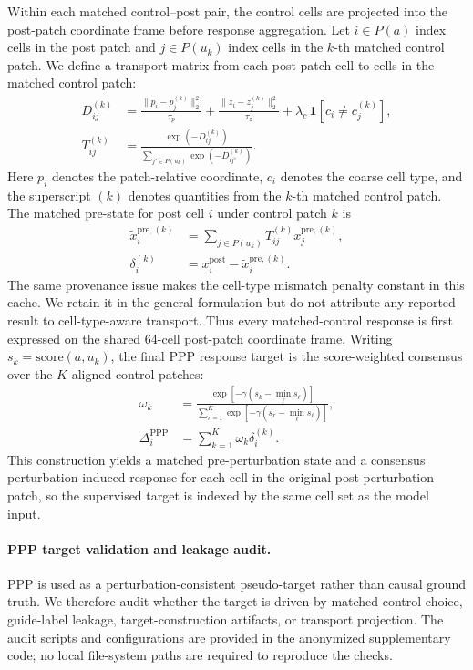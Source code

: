 \documentclass[sigconf,review,balance=false]{acmart}
\begin{document}
Within each matched control--post pair, the control cells are projected into the post-patch coordinate frame before response aggregation. Let $i\in P(a)$ index cells in the post patch and $j\in P(u_k)$ index cells in the $k$-th matched control patch. We define a transport matrix from each post-patch cell to cells in the matched control patch:
\[
\begin{aligned}
D_{ij}^{(k)}
&=
\frac{\|p_i-p_j^{(k)}\|_2^2}{\tau_p}
+
\frac{\|z_i-z_j^{(k)}\|_2^2}{\tau_z}
+
\lambda_c\,\mathbf{1}[c_i\neq c_j^{(k)}],\\
T_{ij}^{(k)}
&=
\frac{\exp(-D_{ij}^{(k)})}
{\sum_{j'\in P(u_k)}\exp(-D_{ij'}^{(k)})}.
\end{aligned}
\]
Here $p_i$ denotes the patch-relative coordinate, $c_i$ denotes the coarse cell type, and the superscript $(k)$ denotes quantities from the $k$-th matched control patch. The matched pre-state for post cell $i$ under control patch $k$ is
\[
\begin{aligned}
\widetilde{x}^{\mathrm{pre},(k)}_i
&=
\sum_{j\in P(u_k)}T^{(k)}_{ij}x^{\mathrm{pre},(k)}_j,\\
\delta_i^{(k)}
&=
x_i^{\mathrm{post}}-\widetilde{x}^{\mathrm{pre},(k)}_i .
\end{aligned}
\]
The same provenance issue makes the cell-type mismatch penalty constant in
this cache. We retain it in the general formulation but do not attribute any
reported result to cell-type-aware transport.
Thus every matched-control response is first expressed on the shared 64-cell post-patch coordinate frame. Writing $s_k=\mathrm{score}(a,u_k)$, the final PPP response target is the score-weighted consensus over the $K$ aligned control patches:
\[
\begin{aligned}
\omega_k
&=
\frac{
\exp[-\gamma(s_k-\min_{\ell}s_\ell)]
}{
\sum_{r=1}^{K}\exp[-\gamma(s_r-\min_{\ell}s_\ell)]
},\\
\Delta_i^{\mathrm{PPP}}
&=
\sum_{k=1}^{K}\omega_k\delta_i^{(k)} .
\end{aligned}
\]
This construction yields a matched pre-perturbation state and a consensus perturbation-induced response for each cell in the original post-perturbation patch, so the supervised target is indexed by the same cell set as the model input.

\paragraph{PPP target validation and leakage audit.}
PPP is used as a perturbation-consistent pseudo-target rather than causal ground truth. We therefore audit whether the target is driven by matched-control choice, guide-label leakage, target-construction artifacts, or transport projection. The audit scripts and configurations are provided in the anonymized supplementary code; no local file-system paths are required to reproduce the checks.
\end{document}
